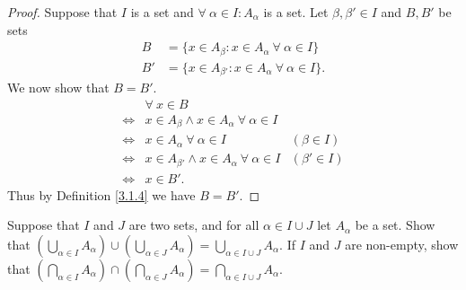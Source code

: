 \begin{proof}
Suppose that \(I\) is a set and \(\forall\ \alpha \in I : A_{\alpha}\) is a set.
Let \(\beta, \beta' \in I\) and \(B, B'\) be sets
\begin{align*}
B &= \{x \in A_{\beta} : x \in A_{\alpha} \ \forall\ \alpha \in I\} \\
B' &= \{x \in A_{\beta'} : x \in A_{\alpha} \ \forall\ \alpha \in I\}.
\end{align*}
We now show that \(B = B'\).
\begin{align*}
& \forall\ x \in B \\
\iff & x \in A_{\beta} \land x \in A_{\alpha} \ \forall\ \alpha \in I \\
\iff & x \in A_{\alpha} \ \forall\ \alpha \in I & (\beta \in I) \\
\iff & x \in A_{\beta'} \land x \in A_{\alpha} \ \forall\ \alpha \in I & (\beta' \in I) \\
\iff & x \in B'.
\end{align*}
Thus by Definition \ref{3.1.4} we have \(B = B'\).
\end{proof}

\begin{exercise}\label{ex 3.4.10}
Suppose that \(I\) and \(J\) are two sets, and for all \(\alpha \in I \cup J\) let \(A_{\alpha}\) be a set.
Show that \((\bigcup_{\alpha \in I} A_{\alpha}) \cup (\bigcup_{\alpha \in J} A_{\alpha}) = \bigcup_{\alpha \in I \cup J} A_{\alpha}\).
If \(I\) and \(J\) are non-empty, show that \((\bigcap_{\alpha \in I} A_{\alpha}) \cap (\bigcap_{\alpha \in J} A_{\alpha}) = \bigcap_{\alpha \in I \cup J} A_{\alpha}\).
\end{exercise}

